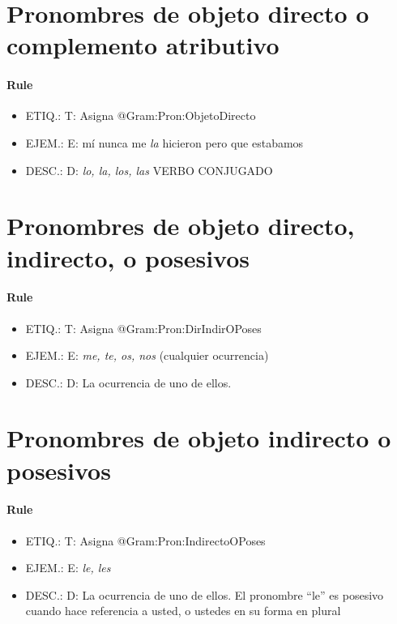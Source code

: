 \documentclass[11pt]{report}
\begin{document}
\section{Pronombres de objeto directo o complemento atributivo}
\paragraph*{Rule}
\begin{itemize}
\item ETIQ.:  T: Asigna @Gram:Pron:ObjetoDirecto
\item EJEM.:  E: mí nunca me \emph{la} hicieron pero que estabamos
\item DESC.:  D: \emph{lo, la, los, las} VERBO CONJUGADO
\end{itemize}

\section{Pronombres de objeto directo, indirecto, o posesivos}
\paragraph*{Rule}
\begin{itemize}
\item ETIQ.:  T: Asigna @Gram:Pron:DirIndirOPoses
\item EJEM.:  E: \emph{me, te, os, nos} (cualquier ocurrencia)
\item DESC.:  D: La ocurrencia de uno de ellos.
\end{itemize}

\section{Pronombres de objeto indirecto o posesivos}
\paragraph*{Rule}
\begin{itemize}
\item ETIQ.:  T: Asigna @Gram:Pron:IndirectoOPoses
\item EJEM.:  E: \emph{le, les}
\item DESC.:  D: La ocurrencia de uno de ellos. El pronombre ``le'' es posesivo cuando hace referencia a usted, o ustedes en su forma en plural
\end{itemize}
\end{document}
